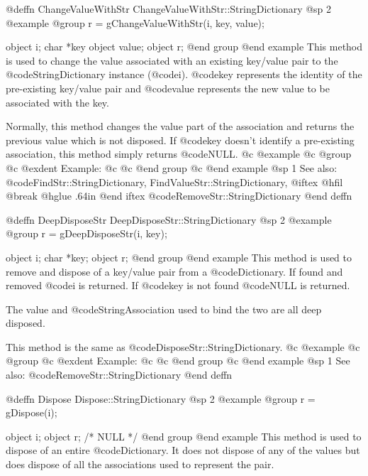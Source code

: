 @deffn {ChangeValueWithStr} ChangeValueWithStr::StringDictionary
@sp 2
@example
@group
r = gChangeValueWithStr(i, key, value);

object  i;
char    *key
object  value;
object  r;
@end group
@end example
This method is used to change the value associated with an existing
key/value pair to the @code{StringDictionary} instance (@code{i}).
@code{key} represents the identity of the pre-existing key/value
pair and @code{value} represents the new value to be associated with
the key.

Normally, this method changes the value part of the association
and returns the previous value which is not disposed.  If
@code{key} doesn't identify a pre-existing association, this method
simply returns @code{NULL}.
@c @example
@c @group
@c @exdent Example:
@c 
@c @end group
@c @end example
@sp 1
See also:  @code{FindStr::StringDictionary, FindValueStr::StringDictionary,}
@iftex
@hfil @break @hglue .64in      
@end iftex
@code{RemoveStr::StringDictionary}
@end deffn








@deffn {DeepDisposeStr} DeepDisposeStr::StringDictionary
@sp 2
@example
@group
r = gDeepDisposeStr(i, key);

object  i;
char    *key;
object  r;
@end group
@end example
This method is used to remove and dispose of a key/value pair from a
@code{Dictionary}.  If found and removed @code{i} is returned.  If @code{key}
is not found @code{NULL} is returned.

The value and @code{StringAssociation} used to bind the two are all deep
disposed.

This method is the same as @code{DisposeStr::StringDictionary}.
@c @example
@c @group
@c @exdent Example:
@c 
@c @end group
@c @end example
@sp 1
See also:  @code{RemoveStr::StringDictionary}
@end deffn













@deffn {Dispose} Dispose::StringDictionary
@sp 2
@example
@group
r = gDispose(i);

object  i;
object  r;     /*  NULL  */
@end group
@end example
This method is used to dispose of an entire @code{Dictionary}.  It does not
dispose of any of the values but does dispose of all the associations
used to represent the pair.  

